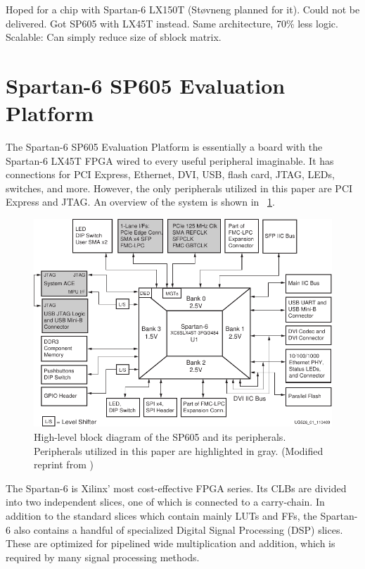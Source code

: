 \TODO
Hoped for a chip with Spartan-6 LX150T (Støvneng planned for it).
Could not be delivered.
Got SP605 with LX45T instead.
Same architecture, 70\% less logic.
Scalable: Can simply reduce size of sblock matrix.

\section{Spartan-6 SP605 Evaluation Platform}

The Spartan-6 SP605 Evaluation Platform is essentially a board with the Spartan-6 LX45T FPGA wired to every useful peripheral imaginable.
It has connections for PCI Express\footnotemark, Ethernet, DVI, USB, flash card, JTAG, LEDs, switches, and more.
However, the only peripherals utilized in this paper are PCI Express and JTAG.
An overview of the system is shown in \figurename~\ref{fig:sp605}.


\begin{figure}[!ht]
    \centering
    \includegraphics[width=\textwidth]{figures/sp605-modified}
    \caption[SP605]{
        High-level block diagram of the SP605 and its peripherals.
        Peripherals utilized in this paper are highlighted in gray.
        (Modified reprint from \cite{ug526})
    }
    \label{fig:sp605}
\end{figure}

The Spartan-6 is Xilinx' most cost-effective FPGA series.
Its CLBs are divided into two independent slices, one of which is connected to a carry-chain.
In addition to the standard slices which contain mainly LUTs and FFs, the Spartan-6 also contains a handful of specialized Digital Signal Processing (DSP) slices.
These are optimized for pipelined wide multiplication and addition, which is required by many signal processing methods.

